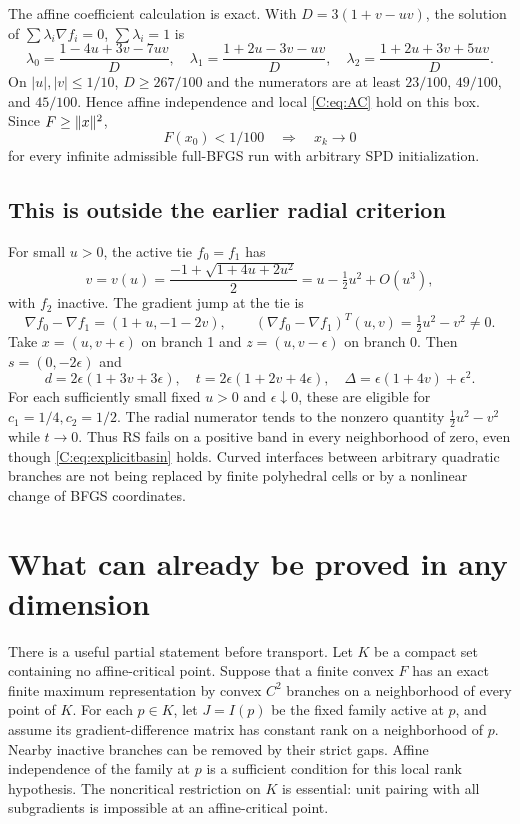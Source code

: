 The affine coefficient calculation is exact. With $D=3(1+v-uv)$, the solution of $\sum\lambda_i\nabla f_i=0$, $\sum\lambda_i=1$ is
\[
 \lambda_0=\frac{1-4u+3v-7uv}{D},\quad
 \lambda_1=\frac{1+2u-3v-uv}{D},\quad
 \lambda_2=\frac{1+2u+3v+5uv}{D}.
\]
On $|u|,|v|\le1/10$, $D\ge267/100$ and the numerators are at least $23/100$, $49/100$, and $45/100$. Hence affine independence and local \eqref{C:eq:AC} hold on this box. Since $F\ge\lVert x\rVert^2$,
\begin{equation}\label{C:eq:explicitbasin}
 \boxed{F(x_0)<1/100\quad\Longrightarrow\quad x_k\to0}
\end{equation}
for every infinite admissible full-BFGS run with arbitrary SPD initialization.



\subsection{This is outside the earlier radial criterion}
For small $u>0$, the active tie $f_0=f_1$ has
\[
 v=v(u)=\frac{-1+\sqrt{1+4u+2u^2}}2
 =u-\tfrac12u^2+O(u^3),
\]
with $f_2$ inactive. The gradient jump at the tie is
\[
 \nabla f_0-\nabla f_1=(1+u,-1-2v),\qquad
 (\nabla f_0-\nabla f_1)^T(u,v)=\tfrac12u^2-v^2\ne0.
\]
Take $x=(u,v+\epsilon)$ on branch 1 and $z=(u,v-\epsilon)$ on branch 0. Then $s=(0,-2\epsilon)$ and
\[
 d=2\epsilon(1+3v+3\epsilon),\quad
 t=2\epsilon(1+2v+4\epsilon),\quad
 \Delta=\epsilon(1+4v)+\epsilon^2.
\]
For each sufficiently small fixed $u>0$ and $\epsilon\downarrow0$, these are eligible for $c_1=1/4,c_2=1/2$. The radial numerator tends to the nonzero quantity $\tfrac12u^2-v^2$ while $t\to0$. Thus RS fails on a positive band in every neighborhood of zero, even though \eqref{C:eq:explicitbasin} holds. Curved interfaces between arbitrary quadratic branches are not being replaced by finite polyhedral cells or by a nonlinear change of BFGS coordinates.


\setcounter{section}{8}
\setcounter{theorem}{7}
\setcounter{equation}{17}


\section{What can already be proved in any dimension}

There is a useful partial statement before transport. Let $K$ be a compact set containing no affine-critical point. Suppose that a finite convex $F$ has an exact finite maximum representation by convex $C^2$ branches on a neighborhood of every point of $K$. For each $p\in K$, let $J=I(p)$ be the fixed family active at $p$, and assume its gradient-difference matrix has constant rank on a neighborhood of $p$. Nearby inactive branches can be removed by their strict gaps. Affine independence of the family at $p$ is a sufficient condition for this local rank hypothesis. The noncritical restriction on $K$ is essential: unit pairing with all subgradients is impossible at an affine-critical point.

